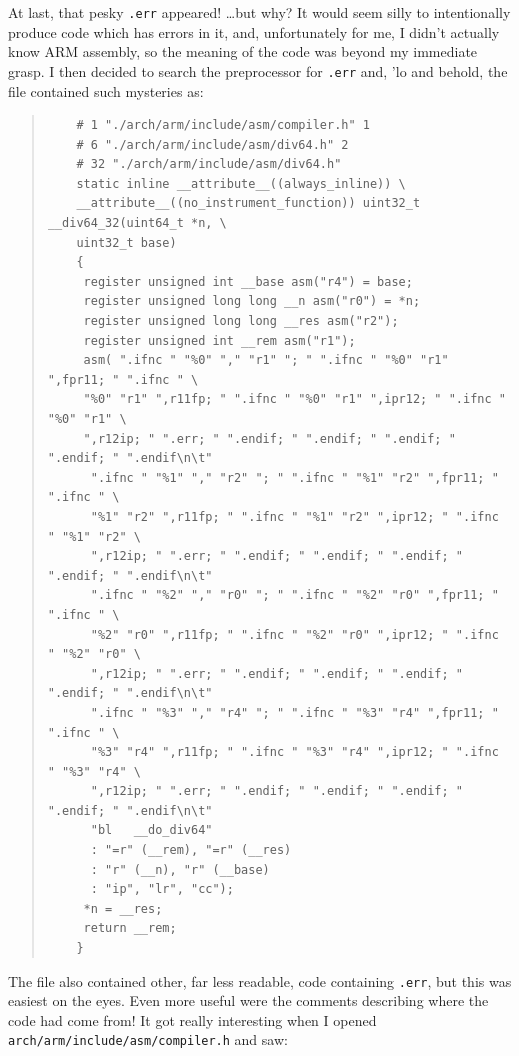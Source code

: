 \documentclass{article}
\begin{document}
At last, that pesky \texttt{.err} appeared!  \ldots but why?  It would seem silly to intentionally produce code which has errors in it, and, unfortunately for me, I didn't actually know ARM assembly, so the meaning of the code was beyond my immediate grasp.  I then decided to search the preprocessor for \texttt{.err} and, 'lo and behold, the file contained such mysteries as:

\begin{quote}
\begin{verbatim}
	# 1 "./arch/arm/include/asm/compiler.h" 1
	# 6 "./arch/arm/include/asm/div64.h" 2
	# 32 "./arch/arm/include/asm/div64.h"
	static inline __attribute__((always_inline)) \
	__attribute__((no_instrument_function)) uint32_t __div64_32(uint64_t *n, \
	uint32_t base)
	{
	 register unsigned int __base asm("r4") = base;
	 register unsigned long long __n asm("r0") = *n;
	 register unsigned long long __res asm("r2");
	 register unsigned int __rem asm("r1");
	 asm( ".ifnc " "%0" "," "r1" "; " ".ifnc " "%0" "r1" ",fpr11; " ".ifnc " \
	 "%0" "r1" ",r11fp; " ".ifnc " "%0" "r1" ",ipr12; " ".ifnc " "%0" "r1" \
	 ",r12ip; " ".err; " ".endif; " ".endif; " ".endif; " ".endif; " ".endif\n\t"
	  ".ifnc " "%1" "," "r2" "; " ".ifnc " "%1" "r2" ",fpr11; " ".ifnc " \
	  "%1" "r2" ",r11fp; " ".ifnc " "%1" "r2" ",ipr12; " ".ifnc " "%1" "r2" \
	  ",r12ip; " ".err; " ".endif; " ".endif; " ".endif; " ".endif; " ".endif\n\t"
	  ".ifnc " "%2" "," "r0" "; " ".ifnc " "%2" "r0" ",fpr11; " ".ifnc " \
	  "%2" "r0" ",r11fp; " ".ifnc " "%2" "r0" ",ipr12; " ".ifnc " "%2" "r0" \
	  ",r12ip; " ".err; " ".endif; " ".endif; " ".endif; " ".endif; " ".endif\n\t"
	  ".ifnc " "%3" "," "r4" "; " ".ifnc " "%3" "r4" ",fpr11; " ".ifnc " \
	  "%3" "r4" ",r11fp; " ".ifnc " "%3" "r4" ",ipr12; " ".ifnc " "%3" "r4" \
	  ",r12ip; " ".err; " ".endif; " ".endif; " ".endif; " ".endif; " ".endif\n\t"
	  "bl	__do_div64"
	  : "=r" (__rem), "=r" (__res)
	  : "r" (__n), "r" (__base)
	  : "ip", "lr", "cc");
	 *n = __res;
	 return __rem;
	}
\end{verbatim}
\end{quote}

The file also contained other, far less readable, code containing \texttt{.err}, but this was easiest on the eyes.  Even more useful were the comments describing where the code had come from!  It got really interesting when I opened \texttt{arch/arm/include/asm/compiler.h} and saw:
\end{document}
